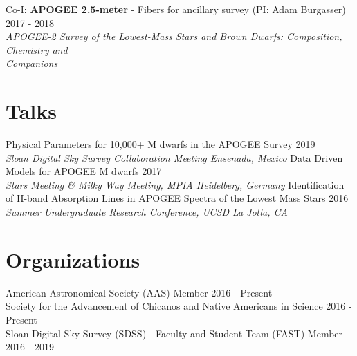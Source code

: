 \documentclass[margin,line]{resume}
\begin{document}
\begin{resume}
\newpage
Co-I: \textbf{APOGEE 2.5-meter} - Fibers for ancillary survey (PI: Adam Burgasser) \hfill 2017 - 2018 \\
\-\hspace{.25cm} \textit{APOGEE-2 Survey of the Lowest-Mass Stars and Brown Dwarfs: Composition, Chemistry and \\\-\hspace{.25cm}  Companions}



\section{\mysidestyle \textcolor{bcolor}{Talks}}
Physical Parameters for 10,000+ M dwarfs in the APOGEE Survey \hfill 2019 \\ 
\-\hspace{.25cm} \textit{Sloan Digital Sky Survey Collaboration Meeting \hfill Ensenada, Mexico}\vspace{.1cm} \newline
Data Driven Models for APOGEE M dwarfs \hfill 2017 \\ 
\-\hspace{.25cm} \textit{Stars Meeting  \& Milky Way Meeting, MPIA \hfill Heidelberg, Germany}\vspace{.1cm} \newline
Identification of H-band Absorption Lines in APOGEE Spectra of the Lowest Mass Stars \hfill 2016 \\ 
\-\hspace{.25cm} \textit{Summer Undergraduate Research Conference, UCSD \hfill La Jolla, CA}


\section{\mysidestyle \textcolor{bcolor}{Organizations}}
American Astronomical Society (AAS) Member \hfill 2016 - Present \\
Society for the Advancement of Chicanos and Native Americans in Science \hfill 2016 - Present \\
Sloan Digital Sky Survey (SDSS) - Faculty and Student Team (FAST) Member \hfill 2016 - 2019 



\end{resume}
\end{document}
